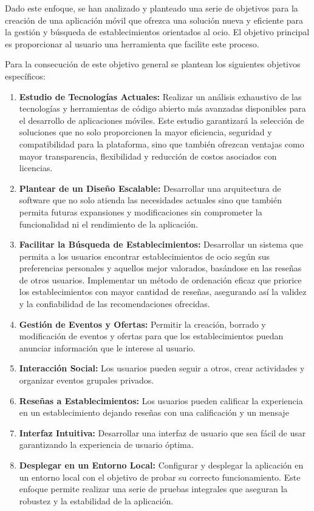 Dado este enfoque, se han analizado y planteado una serie de objetivos para la creación de una aplicación móvil
que ofrezca una solución nueva y eficiente para la gestión y búsqueda de establecimientos orientados al ocio. El
objetivo principal es proporcionar al usuario una herramienta que facilite este proceso.

Para la consecución de este objetivo general se plantean los siguientes objetivos específicos:

\begin{enumerate}
      \item \textbf{Estudio de Tecnologías Actuales: }Realizar un análisis exhaustivo de las tecnologías y herramientas de código abierto más avanzadas disponibles para el desarrollo de aplicaciones móviles. Este estudio garantizará la selección de soluciones que no solo proporcionen la mayor eficiencia, seguridad y compatibilidad para la plataforma, sino que también ofrezcan ventajas como mayor transparencia, flexibilidad y reducción de costos asociados con licencias.
      \item \textbf{Plantear de un Diseño Escalable: }Desarrollar una arquitectura de software que no solo atienda las necesidades actuales sino que también permita futuras expansiones y modificaciones sin comprometer la funcionalidad ni el rendimiento de la aplicación.
      \item \textbf{Facilitar la Búsqueda de Establecimientos:} Desarrollar un sistema que permita a los usuarios encontrar establecimientos de ocio según sus preferencias personales y aquellos mejor valorados, basándose en las reseñas de otros usuarios. Implementar un método de ordenación eficaz que priorice los establecimientos con mayor cantidad de reseñas, asegurando así la validez y la confiabilidad de las recomendaciones ofrecidas.
      \item \textbf{Gestión de Eventos y Ofertas:} Permitir la creación, borrado y modificación de eventos y
            ofertas para que los establecimientos puedan anunciar información que le interese al usuario.
      \item \textbf{Interacción Social:} Los usuarios pueden seguir a otros, crear actividades y organizar eventos
            grupales privados.
      \item \textbf{Reseñas a Establecimientos:} Los usuarios pueden calificar la experiencia en un
            establecimiento dejando reseñas con una calificación y un mensaje
      \item \textbf{Interfaz Intuitiva:} Desarrollar una interfaz de usuario que sea fácil de usar garantizando la
            experiencia de usuario óptima.
      \item \textbf{Desplegar en un Entorno Local: }Configurar y desplegar la aplicación en un entorno local con el objetivo de probar su correcto funcionamiento. Este enfoque permite realizar una serie de pruebas integrales que aseguran la robustez y la estabilidad de la aplicación.
\end{enumerate}



